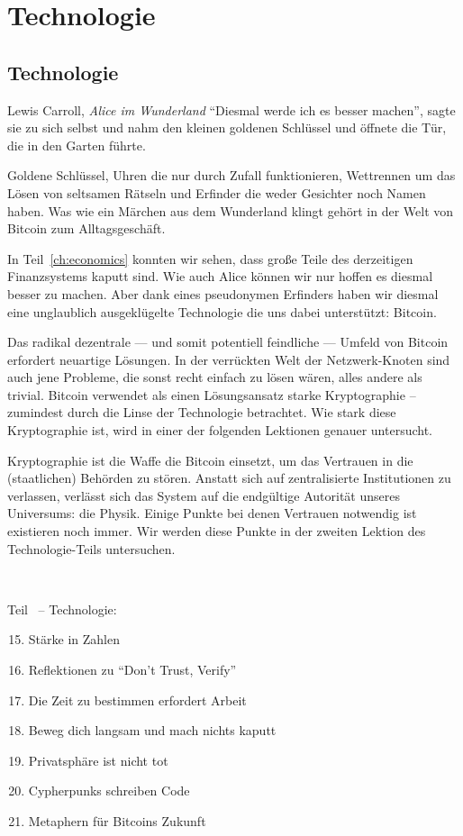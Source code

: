 \part{Technologie}
\label{ch:technology}
\chapter*{Technologie}

\begin{chapquote}{Lewis Carroll, \textit{Alice im Wunderland}}
\enquote{Diesmal werde ich es besser machen}, sagte sie zu sich selbst und nahm
den kleinen goldenen Schlüssel und öffnete die Tür, die in den Garten führte.
\end{chapquote}

Goldene Schlüssel, Uhren die nur durch Zufall funktionieren, Wettrennen um das
Lösen von seltsamen Rätseln und Erfinder die weder Gesichter noch Namen haben.
Was wie ein Märchen aus dem Wunderland klingt gehört in der Welt von Bitcoin zum
Alltagsgeschäft.

In Teil~\ref{ch:economics} konnten wir sehen, dass große Teile des derzeitigen
Finanzsystems kaputt sind. Wie auch Alice können wir nur hoffen es diesmal
besser zu machen. Aber dank eines pseudonymen Erfinders haben wir diesmal eine
unglaublich ausgeklügelte Technologie die uns dabei unterstützt: Bitcoin.

Das radikal dezentrale --- und somit potentiell feindliche --- Umfeld von
Bitcoin  erfordert neuartige Lösungen. In der verrückten Welt der
Netzwerk-Knoten sind auch jene Probleme, die sonst recht einfach zu lösen wären,
alles andere als trivial. Bitcoin verwendet als einen Lösungsansatz starke
Kryptographie – zumindest durch die Linse der Technologie betrachtet. Wie stark
diese Kryptographie ist, wird in einer der folgenden Lektionen genauer
untersucht.

Kryptographie ist die Waffe die Bitcoin einsetzt, um das Vertrauen in die
(staatlichen) Behörden zu stören. Anstatt sich auf zentralisierte Institutionen
zu verlassen, verlässt sich das System auf die endgültige Autorität unseres
Universums: die Physik. Einige Punkte bei denen Vertrauen notwendig ist
existieren noch immer. Wir werden diese Punkte in der zweiten Lektion des
Technologie-Teils untersuchen.

~

\begin{samepage}
Teil~\ref{ch:technology} -- Technologie:

\begin{enumerate}
  \setcounter{enumi}{14}
  \item Stärke in Zahlen
  \item Reflektionen zu \enquote{Don't Trust, Verify}
  \item Die Zeit zu bestimmen erfordert Arbeit
  \item Beweg dich langsam und mach nichts kaputt
  \item Privatsphäre ist nicht tot
  \item Cypherpunks schreiben Code
  \item Metaphern für Bitcoins Zukunft
\end{enumerate}
\end{samepage}

